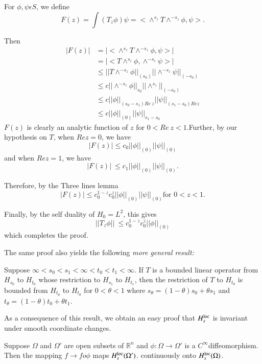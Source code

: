 For $\phi, \psi \epsilon S$, we define 
$$
F(z)= \int (T_z \phi ) \psi = < \wedge^{s_z}T \wedge^{-s_z} \phi, \psi >. 
$$

Then 
\begin{align*}
  |F(z)|   & = | < \wedge^{s_z} T \wedge^{-s_z}\phi, \psi > |\\
  & = | < T  \wedge^{s_z}\phi, \wedge^{-s_z}\psi >|\\
  & \leq || T \wedge^{-s_z} \phi ||_(s_0) ||\wedge^{-s_z}\psi ||_{(-s_0)}\\
  & \leq c ||\wedge^{-s_z}\phi ||_{s_0}||\wedge^{s_z}||_{(-s_0)}\\
  & \leq c ||\phi ||_{(s_0-s_1) Re ~z} ||\psi ||_{(s_1- s_0) Re z}\\
  & \leq c || \phi ||_{(0)} || \psi ||_{s_1-s_0}
\end{align*}
$F(z)$ is clearly an analytic function of $z$ for $0 < Re ~ z <
1$.\pageoriginale Further, by our hypothesis on $T$, when $Re z = 0$, we have  
$$
|F(z)| \leq c_0|| \phi || _{(0)}||\psi||_{(0)}
$$
and when $Re z=1$, we have
$$
|F(z)|\ \leq c_1 || \phi || _{(0)}||\psi||_{(0)}.
$$

Therefore, by the Three lines lemma 
$$
|F(z)| \leq c^{1-z}_0 c^{z}_0 || \phi || _{(0)}||\psi||_{(0)}\text{
  for } 0 < z< 1. 
$$

Finally, by the self duality of $H_0 = L^2$, this gives 
$$
||T_z \phi ||\ \leq c^{1-z}_0 c^{z}_0 || \phi || _{(0)}
$$
which completes the proof. 

\setcounter{rem}{21}
\begin{rem} \label{chap3:sec1:rem3.22}%
  The same proof also yields the following \textit{more general result: }
  
  Suppose $\infty < s_0< s_1< \infty < t_0< t_1<\infty $. If $T$ is a
  bounded linear operator from $H_{s_0}$ to $H_{t_0}$ whose restriction
  to $H_{s_1}$ to $H_{t_1}$,  then the restriction of $T$ to
  $H_{t_\theta}$ is bounded from $H_{t_\theta}$ to $H_{t_\theta}$ for $0
  < \theta < 1$ where $s_\theta = (1 - \theta)s_0 + \theta s_1$ and
  $t_\theta = (1-\theta) t_0 + \theta t_1$.  
  
  As a consequence of this result, we obtain an easy proof that
  $H^{\operatorname{loc}}_s$ is invariant under smooth coordinate changes.  
\end{rem}

\setcounter{thm}{22}
\begin{thm} \label{chap3:sec1:thm3.23}%
Suppose $\Omega$ and $\Omega'$  are open subsets of
  $\mathbb{R}^n$ and $\phi: \Omega \to \Omega'$ is a
  $C^\infty$\pageoriginale diffeomorphism. Then the mapping $f \to f o \phi $ maps
  $H^{\operatorname{loc}}_s(\Omega')$. continuously onto $H^{\operatorname{loc}}_{s}(\Omega)$. 
\end{thm}


